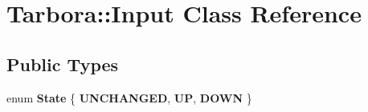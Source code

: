 \hypertarget{classTarbora_1_1Input}{}\section{Tarbora\+:\+:Input Class Reference}
\label{classTarbora_1_1Input}
\subsection*{Public Types}
\begin{DoxyCompactItemize}
\item 
\mbox{\label{classTarbora_1_1Input_ada5f47dd8b178a810ba4f50f3797fe4a}} 
enum {\bfseries State} \{ {\bfseries U\+N\+C\+H\+A\+N\+G\+ED}, 
{\bfseries UP}, 
{\bfseries D\+O\+WN}
 \}
\end{DoxyCompactItemize}
